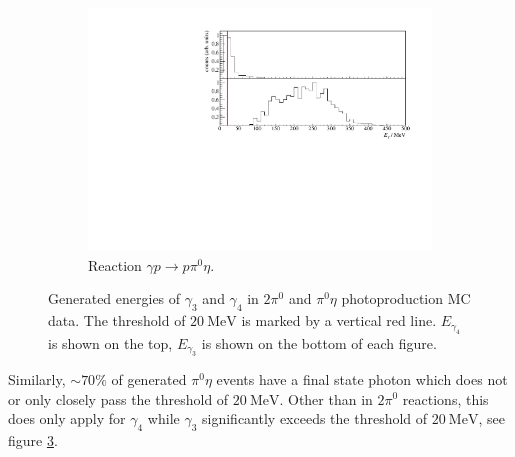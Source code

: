 \begin{figure}[htbp]
\begin{subfigure}{\linewidth}
		\label{fig:mcgammas_a}
	\end{subfigure}
	\begin{subfigure}{\linewidth}
		\includegraphics[width=\linewidth]{../figs/hydrogen/mcgammas_pi0eta.pdf}
		\caption{Reaction $\gamma p\to p\pi^0\eta $.}
		\label{fig:mcgammas_b}
	\end{subfigure}			
 				\caption{Generated energies of $\gamma_3$ and $\gamma_4$ in $2\pi^0$ and $\pi^0\eta$ photoproduction MC data. The threshold of $\SI{20}{\mega\eV}$ is marked by a vertical red line. $E_{\gamma_4}$ is shown on the top, $E_{\gamma_3}$ is shown on the bottom of each figure.}
 \end{figure}
 Similarly, $\sim70\%$ of generated $\pi^0\eta$ events have a final state photon which does not or only closely pass the threshold of $\SI{20}{\mega\eV}$. Other than in $2\pi^0$ reactions, this does only apply for $\gamma_4$ while $\gamma_3$ significantly exceeds the threshold of $\SI{20}{\mega\eV}$, see figure \ref{fig:mcgammas_b}. 
 
